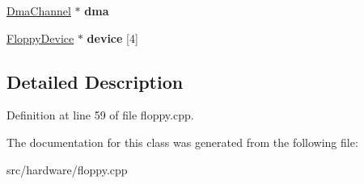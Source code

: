 \begin{DoxyCompactItemize}
\item 
\hypertarget{classFloppyController_a03a815344538d3ffe9b796369e87b86e}{\hyperlink{classDmaChannel}{Dma\-Channel} $\ast$ {\bfseries dma}}\label{classFloppyController_a03a815344538d3ffe9b796369e87b86e}

\item 
\hypertarget{classFloppyController_a37fba88fd67d407f6f42c8af12818d2a}{\hyperlink{classFloppyDevice}{Floppy\-Device} $\ast$ {\bfseries device} \mbox{[}4\mbox{]}}\label{classFloppyController_a37fba88fd67d407f6f42c8af12818d2a}

\end{DoxyCompactItemize}


\subsection{Detailed Description}


Definition at line 59 of file floppy.\-cpp.



The documentation for this class was generated from the following file\-:\begin{DoxyCompactItemize}
\item 
src/hardware/floppy.\-cpp\end{DoxyCompactItemize}
